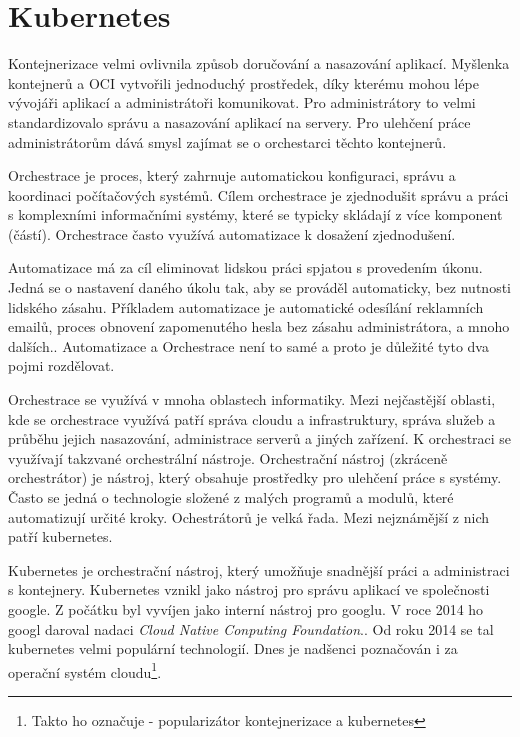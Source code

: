 \section{Kubernetes}

Kontejnerizace velmi ovlivnila způsob doručování a nasazování aplikací. Myšlenka kontejnerů a OCI vytvořili jednoduchý prostředek, díky kterému mohou lépe vývojáři aplikací a administrátoři komunikovat. Pro administrátory to velmi standardizovalo správu a nasazování aplikací na servery. Pro ulehčení práce administrátorům dává smysl zajímat se o orchestarci těchto kontejnerů. 

Orchestrace je proces, který zahrnuje automatickou konfiguraci, správu a koordinaci počítačových systémů. Cílem orchestrace je zjednodušit správu a práci s komplexními informačními systémy, které se typicky skládají z více komponent (částí).\cite{a2019_what} Orchestrace často využívá automatizace k dosažení zjednodušení.

Automatizace má za cíl eliminovat lidskou práci spjatou s provedením úkonu. Jedná se o nastavení daného úkolu tak, aby se prováděl automaticky, bez nutnosti lidského zásahu. Příkladem automatizace je automatické odesílání reklamních emailů, proces obnovení zapomenutého hesla bez zásahu administrátora, a mnoho dalších.\cite{watts_2020_it}\cite{a2019_what}. Automatizace a Orchestrace není to samé a proto je důležité tyto dva pojmi rozdělovat. 

Orchestrace se využívá v mnoha oblastech informatiky. Mezi nejčastější oblasti, kde se orchestrace využívá patří správa cloudu a infrastruktury, správa služeb a průběhu jejich nasazování, administrace serverů a jiných zařízení. K orchestraci se využívají takzvané orchestrální nástroje. Orchestrační nástroj (zkráceně orchestrátor) je nástroj, který obsahuje prostředky pro ulehčení práce s systémy. Často se jedná o technologie složené z malých programů a modulů, které automatizují určité kroky. Ochestrátorů je velká řada. Mezi nejznámější z nich patří kubernetes. \cite{goldberg_2019_workflow}

Kubernetes je orchestrační nástroj, který umožňuje snadnější práci a administraci s kontejnery. Kubernetes vznikl jako nástroj pro správu aplikací ve společnosti google. Z počátku byl vyvíjen jako interní nástroj pro googlu. V roce 2014 ho googl daroval nadaci \textit{Cloud Native Conputing Foundation}.\cite{poulton_2022_the}. Od roku 2014 se tal kubernetes velmi populární technologií. Dnes je nadšenci poznačován i za operační systém cloudu\footnote{Takto ho označuje - popularizátor kontejnerizace a kubernetes}. 

